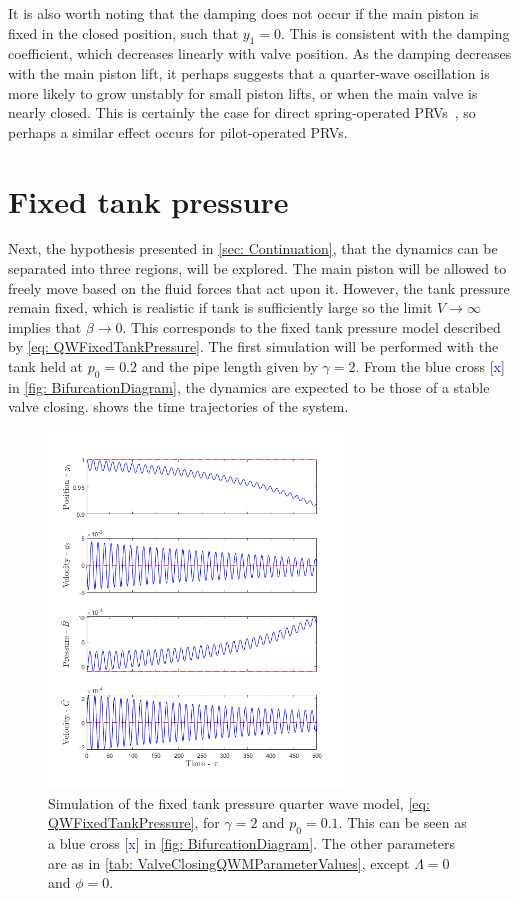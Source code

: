 It is also worth noting that the damping does not occur if the main piston is fixed in the closed position, such that $y_1 = 0$. This is consistent with the damping coefficient, which decreases linearly with valve position. As the damping decreases with the main piston lift, it perhaps suggests that a quarter-wave oscillation is more likely to grow unstably for small piston lifts, or when the main valve is nearly closed. This is certainly the case for direct spring-operated PRVs~\cite{Hos2017DynamicRecommendations}, so perhaps a similar effect occurs for pilot-operated PRVs.

\section{Fixed tank pressure}

Next, the hypothesis presented in \cref{sec: Continuation}, that the dynamics can be separated into three regions, will be explored. The main piston will be allowed to freely move based on the fluid forces that act upon it. However, the tank pressure remain fixed, which is realistic if tank is sufficiently large so the limit $V \rightarrow \infty$ implies that $\beta \rightarrow 0$. This corresponds to the fixed tank pressure model described by \cref{eq: QWFixedTankPressure}. The first simulation will be performed with the tank held at $p_0 = 0.2$ and the pipe length given by $\gamma = 2$. From the blue cross [\textcolor{Blue}{x}] in \cref{fig: BifurcationDiagram}, the dynamics are expected to be those of a stable valve closing.  shows the time trajectories of the system.
~
\begin{figure}[ht]
    \centering
    \includegraphics[width=0.7\textwidth]{Figures/CloseToHopf/HopfStable.png}
    \caption{Simulation of the fixed tank pressure quarter wave model, \cref{eq: QWFixedTankPressure}, for $\gamma = 2$ and $p_0 = 0.1$. This can be seen as a blue cross [\textcolor{Blue}{x}] in \cref{fig: BifurcationDiagram}. The other parameters are as in \cref{tab: ValveClosingQWMParameterValues}, except $\Lambda=0$ and $\phi=0$.}
    \label{fig: StableHopf}
\end{figure}

